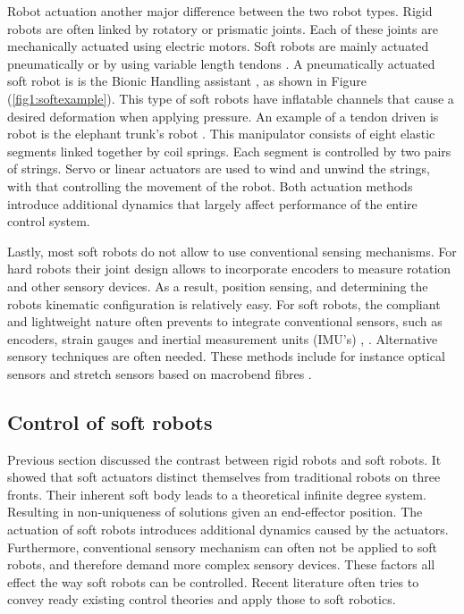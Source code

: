 Robot actuation another major difference between the two robot types. Rigid robots are often linked by rotatory or prismatic joints. Each of these joints are mechanically actuated using electric motors. Soft robots are mainly actuated pneumatically or by using variable length tendons \cite{Rus2015}. A pneumatically actuated soft robot is is the Bionic Handling assistant \cite{rolf2012constant}, as shown in Figure (\ref{fig1:softexample}). This type of soft robots have inflatable channels that cause a desired deformation when applying pressure. An example of a tendon driven is robot is the elephant trunk's robot \cite{cieslak1999elephant}. This manipulator consists of eight elastic segments linked together by coil springs. Each segment is controlled by two pairs of strings. Servo or linear actuators are used to wind and unwind the strings, with that controlling the movement of the robot. Both actuation methods introduce additional dynamics that largely affect performance of the entire control system. 

Lastly, most soft robots do not allow to use conventional sensing mechanisms. For hard robots their joint design allows to incorporate encoders to measure rotation and other sensory devices. As a result, position sensing, and determining the robots kinematic configuration is relatively easy. For soft robots, the compliant and lightweight nature often prevents to integrate conventional sensors, such as encoders, strain gauges and inertial measurement units (IMU's) \cite{Rus2015}, \cite{Lee2017}. Alternative sensory techniques are often needed. These methods include for instance optical sensors and stretch sensors based on macrobend fibres \cite{Sareh2015}.

\subsection{Control of soft robots}

Previous section discussed the contrast between rigid robots and soft robots. It showed that soft actuators distinct themselves from traditional robots on three fronts. Their inherent soft body leads to a theoretical infinite degree system. Resulting in non-uniqueness of solutions given an end-effector position. The actuation of soft robots introduces additional dynamics caused by the actuators. Furthermore, conventional sensory mechanism can often not be applied to soft robots, and therefore demand more complex sensory devices. These factors all effect the way soft robots can be controlled. Recent literature often tries to convey ready existing control theories and apply those to soft robotics.

